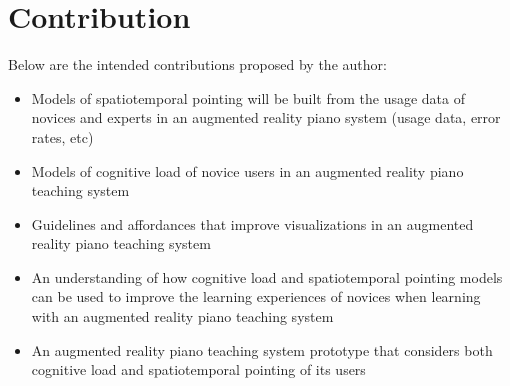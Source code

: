 \documentclass[manuscript,screen]{acmart}
\begin{document}
\section{Contribution}
Below are the intended contributions proposed by the author:
\begin{itemize}
    \item Models of spatiotemporal pointing will be built from the usage data of novices and experts in an augmented reality piano system (usage data, error rates, etc)
    \item Models of cognitive load of novice users in an augmented reality piano teaching system
    \item Guidelines and affordances that improve visualizations in an augmented reality piano teaching system
    \item An understanding of how cognitive load and spatiotemporal pointing models can be used to improve the learning experiences of novices when learning with an augmented reality piano teaching system
    \item An augmented reality piano teaching system prototype that considers both cognitive load and spatiotemporal pointing of its users 
\end{itemize}
\end{document}

